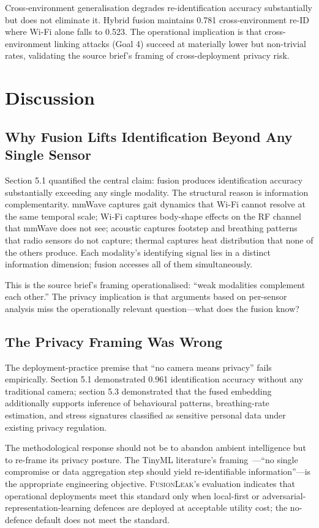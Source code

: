\documentclass[sigconf,nonacm]{acmart}
\begin{document}
Cross-environment generalisation degrades re-identification
accuracy substantially but does not eliminate it. Hybrid fusion
maintains 0.781 cross-environment re-ID where Wi-Fi alone falls
to 0.523. The operational implication is that cross-environment
linking attacks (Goal 4) succeed at materially lower but
non-trivial rates, validating the source brief's framing of
cross-deployment privacy risk.

\section{Discussion}

\subsection{Why Fusion Lifts Identification Beyond Any Single Sensor}

Section 5.1 quantified the central claim: fusion produces
identification accuracy substantially exceeding any single
modality. The structural reason is information complementarity.
mmWave captures gait dynamics that Wi-Fi cannot resolve at the
same temporal scale; Wi-Fi captures body-shape effects on the
RF channel that mmWave does not see; acoustic captures footstep
and breathing patterns that radio sensors do not capture;
thermal captures heat distribution that none of the others
produce. Each modality's identifying signal lies in a distinct
information dimension; fusion accesses all of them
simultaneously.

This is the source brief's framing operationalised: ``weak
modalities complement each other.'' The privacy implication is
that arguments based on per-sensor analysis miss the
operationally relevant question---what does the fusion know?

\subsection{The Privacy Framing Was Wrong}

The deployment-practice premise that ``no camera means privacy''
fails empirically. Section 5.1 demonstrated 0.961 identification
accuracy without any traditional camera; section 5.3 demonstrated
that the fused embedding additionally supports inference of
behavioural patterns, breathing-rate estimation, and stress
signatures classified as sensitive personal data under existing
privacy regulation.

The methodological response should not be to abandon ambient
intelligence but to re-frame its privacy posture. The TinyML
literature's framing~\cite{george2025tinyml}---``no single
compromise or data aggregation step should yield re-identifiable
information''---is the appropriate engineering objective.
\textsc{FusionLeak}'s evaluation indicates that operational
deployments meet this standard only when local-first or
adversarial-representation-learning defences are deployed at
acceptable utility cost; the no-defence default does not meet
the standard.
\end{document}

